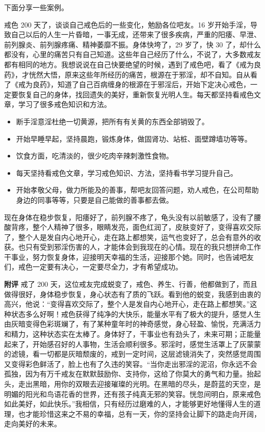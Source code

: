 下面分享一些案例。

\begin{case}
    戒色 200 天了，谈谈自己戒色后的一些变化，勉励各位吧友。16 岁开始手淫，导致自己以后的人生一片昏暗，一事无成，还带来了很多疾病，严重的阳痿、早泄、前列腺炎、前列腺疼痛、精神萎靡不振。身体快垮了，29 岁了，快 30 了，却什么都没有，心里的痛苦只有自己知道。这些年自己经历了什么，不说了，大多数戒友都有相同的地方。我想说说在自己快要绝望的时候，遇到了戒色吧，看了《戒为良药》，才恍然大悟，原来这些年所经历的痛苦，根源在于邪淫，却不自知。自从看了《戒为良药》，知道了自己百病缠身的根源在于邪淫后，开始下定决心戒色，一定要恢复自己的身体，找回遗失的美好，重新恢复光明人生。每天都坚持看戒色文章，学习了很多戒色知识和方法。\begin{itemize}
        \item 断手淫意淫杜绝一切黄源，把所有有关黄的东西全部销毁了。
        \item 开始早睡早起，坚持晨跑，锻炼身体，做固肾功、站桩、面壁蹲墙功等等。
        \item 饮食方面，吃清淡的，很少吃肉辛辣刺激性食物。
        \item 每天坚持看戒色文章，学习戒色知识、方法，坚持看书学习提升自己。
        \item 开始孝敬父母，做力所能及的善事，帮吧友回答问题，劝人戒色，在公司帮助身边的同事等等，只要是自己能做的善事都去做。
    \end{itemize} 现在身体在稳步恢复，阳痿好了，前列腺不疼了，龟头没有以前敏感了，没有了腰酸背疼，整个人精神了很多，眼睛发亮，面色红润了，皮肤变好了，变得喜欢交际了，整个人是发自内心地开心，走在路上都想笑，运气也变好了，总会有意外的收获。也只有受到邪淫伤害的人，才能体会到我现在的心情。现在的我只想拼命工作干事业，努力恢复身体，迎接明天幸福的生活，迎接那个她。同时，也告诫吧友们，戒色一定要有决心，一定要尽全力，才有希望成功。

    \textbf{附评} 戒了 200 天，这位戒友完成蜕变了，戒色、养生、行善，他都做到了，而且做得很好，身体稳步恢复，身心状态有了质的飞跃。看到他的蜕变，我感到由衷的高兴，他说：“变得喜欢交际了，整个人是发自内心地开心，走在路上都想笑。”这种状态多么好啊！戒色获得了纯净的大快乐，能量水平有了极大的提升，感觉人生由灰暗变得色彩斑斓了，有了某种童年时的神奇感觉，身心轻盈、愉悦，充满活力和精力，这种状态实在太棒了。身体好了，干事业也有劲头了，未来可期；正能量起来了，开始感召好的人事物，生活会顺利很多。邪淫时，感觉生活罩上了灰蒙蒙的滤镜，看一切都是灰暗颓废的，戒到一定时间，这层滤镜消失了，突然感觉周围又变得彩色鲜活了，脸上也有了久违的笑容。“当你走出邪淫的泥沼，你永远不会孤独，因为有万千戒友在默默鼓励你、支持你，这给了你莫大的勇气和力量。抬起头，走出黑暗，用你的双眼去迎接璀璨的光明。在黑暗的尽头，是蔚蓝的天空，是明媚的阳光和鸟语花香的世界，还有孩子纯真无邪的笑容。恍忽间明白，原来戒色如此美好，如此快乐。”我相信，只有经历过磨难的人，才能够更好地懂得人生的道理，也才能珍惜这来之不易的幸福，总有一天，你的坚持会让脚下的路走向开阔，走向美好的未来。
\end{case}

